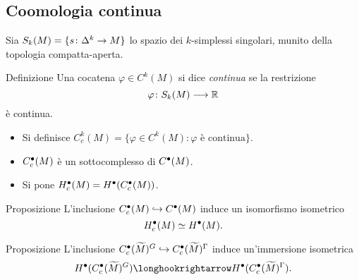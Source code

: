 \documentclass{beamer}
\begin{document}
\subsection*{Coomologia continua}
\begin{frame}{\secname}{\subsecname}
Sia $S_k(M)=\{\map{s}{\Delta^k}{M}\}$ lo spazio dei $k$-simplessi singolari, munito della topologia compatta-aperta.
\pause
\begin{block}{Definizione}
Una cocatena $\varphi\in C^k(M)$ si dice \emph{continua} se la restrizione
\[
\map{\varphi}{S_k(M)}{\RR}
\]
è continua.
\end{block}
\pause
\begin{itemize}
\item Si definisce $C^k_c(M)=\{\varphi\in C^k(M):\text{$\varphi$ è continua}\}$.
\item $C^\bullet_c(M)$ è un sottocomplesso di $C^\bullet(M)$.\pause
\item Si pone $H^\bullet_c(M)=H^\bullet(C^\bullet_c(M))$.
\end{itemize}
\end{frame}
\begin{frame}{\secname}{\subsecname}
\begin{block}{Proposizione}
L'inclusione $C^\bullet_c(M)\hookrightarrow C^\bullet(M)$ induce un isomorfismo isometrico
\[
H^\bullet_c(M)\simeq H^\bullet(M).
\]
\end{block}
\pause
\begin{block}{Proposizione}
L'inclusione $C^\bullet_c(\widetilde M)^G\hookrightarrow C^\bullet_c(\widetilde M)^\Gamma$ induce un'immersione isometrica
\[
H^\bul(C^\bul_c(\widetilde M)^G)\longhookrightarrow H^\bul(C^\bul_c(\widetilde M)^\Gamma).
\]
\end{block}
\end{frame}
\end{document}

